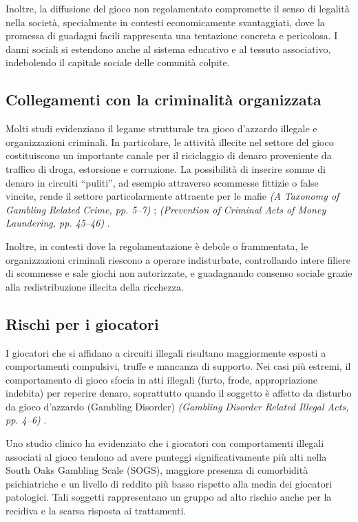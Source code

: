 \documentclass[a4paper,12pt]{article}
\begin{document}
Inoltre, la diffusione del gioco non regolamentato compromette il senso di legalità nella società, specialmente in contesti economicamente svantaggiati, dove la promessa di guadagni facili rappresenta una tentazione concreta e pericolosa. I danni sociali si estendono anche al sistema educativo e al tessuto associativo, indebolendo il capitale sociale delle comunità colpite.

\subsection{Collegamenti con la criminalità organizzata}

Molti studi evidenziano il legame strutturale tra gioco d’azzardo illegale e organizzazioni criminali. In particolare, le attività illecite nel settore del gioco costituiscono un importante canale per il riciclaggio di denaro proveniente da traffico di droga, estorsione e corruzione. La possibilità di inserire somme di denaro in circuiti “puliti”, ad esempio attraverso scommesse fittizie o false vincite, rende il settore particolarmente attraente per le mafie \textit{(A Taxonomy of Gambling Related Crime, pp. 5--7)} \cite{banks2018taxonomy}; \textit{(Prevention of Criminal Acts of Money Laundering, pp. 45--46)} \cite{tarina2019moneylaundering}.

Inoltre, in contesti dove la regolamentazione è debole o frammentata, le organizzazioni criminali riescono a operare indisturbate, controllando intere filiere di scommesse e sale giochi non autorizzate, e guadagnando consenso sociale grazie alla redistribuzione illecita della ricchezza.

\subsection{Rischi per i giocatori}

I giocatori che si affidano a circuiti illegali risultano maggiormente esposti a comportamenti compulsivi, truffe e mancanza di supporto. Nei casi più estremi, il comportamento di gioco sfocia in atti illegali (furto, frode, appropriazione indebita) per reperire denaro, soprattutto quando il soggetto è affetto da disturbo da gioco d’azzardo (Gambling Disorder) \textit{(Gambling Disorder Related Illegal Acts, pp. 4--6)} \cite{gorsane2017illegalacts}.

Uno studio clinico ha evidenziato che i giocatori con comportamenti illegali associati al gioco tendono ad avere punteggi significativamente più alti nella South Oaks Gambling Scale (SOGS), maggiore presenza di comorbidità psichiatriche e un livello di reddito più basso rispetto alla media dei giocatori patologici. Tali soggetti rappresentano un gruppo ad alto rischio anche per la recidiva e la scarsa risposta ai trattamenti.
\end{document}
